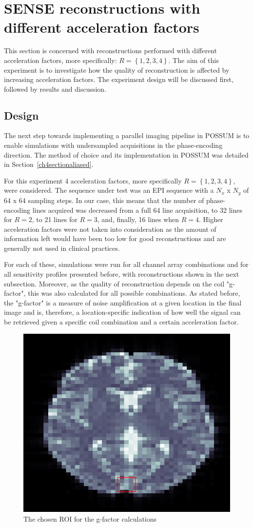 \section{SENSE reconstructions with different acceleration factors} \label{exp2}
This section is concerned with reconstructions performed with different acceleration factors, more specifically: $R = \left\{1, 2, 3, 4\right\}$. The aim of this experiment is to investigate how the quality of reconstruction is affected by increasing acceleration factors. The experiment design will be discussed first, followed by results and discussion.

\subsection{Design}
The next step towards implementing a parallel imaging pipeline in POSSUM is to enable simulations with undersampled acquisitions in the phase-encoding direction. The method of choice and its implementation in POSSUM was detailed in Section~\ref{ch4sectionaliased}. 

For this experiment 4 acceleration factors, more specifically $R = \left\{1, 2, 3, 4\right\}$, were considered. The sequence under test was an EPI sequence with a $N_x$ x $N_y$ of 64 x 64 sampling steps. In our case, this means that the number of phase-encoding lines acquired was decreased from a full 64 line acquisition, to 32 lines for $R = 2$, to 21 lines for $R = 3$, and, finally, 16 lines when $R = 4$. Higher acceleration factors were not taken into consideration as the amount of information left would have been too low for good reconstructions and are generally not used in clinical practices.

For each of these, simulations were run for all channel array combinations and for all sensitivity profiles presented before, with reconstructions shown in the next subsection. Moreover, as the quality of reconstruction depends on the coil "g-factor", this was also calculated for all possible combinations. As stated before, the "g-factor" is a measure of noise amplification at a given location in the final image and is, therefore, a location-specific indication of how well the signal can be retrieved given a specific coil combination and a certain acceleration factor.

\begin{figure}[H]
    \centering
    \includegraphics[width=.3\textwidth,keepaspectratio]{roigfact}
    \caption{The chosen ROI for the g-factor calculations}
    \label{fig:roigfact}
\end{figure}

